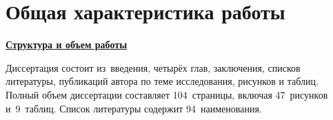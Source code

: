 \section*{Общая характеристика работы}

\newcommand{\actuality}{\pdfbookmark[1]{Актуальность}{actuality}\underline{\textbf{\actualityTXT}}}
\newcommand{\progress}{\pdfbookmark[1]{Разработанность темы}{progress}\underline{\textbf{\progressTXT}}}
\newcommand{\aim}{\pdfbookmark[1]{Цели}{aim}\underline{{\textbf\aimTXT}}}
\newcommand{\tasks}{\pdfbookmark[1]{Задачи}{tasks}\underline{\textbf{\tasksTXT}}}
\newcommand{\aimtasks}{\pdfbookmark[1]{Цели и задачи}{aimtasks}\aimtasksTXT}
\newcommand{\novelty}{\pdfbookmark[1]{Научная новизна}{novelty}\underline{\textbf{\noveltyTXT}}}
\newcommand{\influence}{\pdfbookmark[1]{Практическая значимость}{influence}\underline{\textbf{\influenceTXT}}}
\newcommand{\methods}{\pdfbookmark[1]{Методология и методы исследования}{methods}\underline{\textbf{\methodsTXT}}}
\newcommand{\defpositions}{\pdfbookmark[1]{Основные положения, выносимые на защиту}{defpositions}\underline{\textbf{\defpositionsTXT}}}
\newcommand{\reliability}{\pdfbookmark[1]{Достоверность}{reliability}\underline{\textbf{\reliabilityTXT}}}
\newcommand{\probation}{\pdfbookmark[1]{Апробация}{probation}\underline{\textbf{\probationTXT}}}
\newcommand{\contribution}{\pdfbookmark[1]{Личный вклад}{contribution}\underline{\textbf{\contributionTXT}}}
\newcommand{\publications}{\pdfbookmark[1]{Публикации}{publications}\underline{\textbf{\publicationsTXT}}}
\newcommand{\structureandsize}{\pdfbookmark[1]{Структура и объем работы}{structureandsize}\underline{\textbf{\structureandsizeTXT}}}



\underline{\textbf{Структура и объем работы}}

Диссертация состоит из~введения, четырёх глав, заключения, списков литературы, публикаций автора по теме исследования, рисунков и таблиц. Полный объем диссертации составляет 104~страницы, включая 47~рисунков и~9~таблиц. Список литературы содержит 94~наименования.

